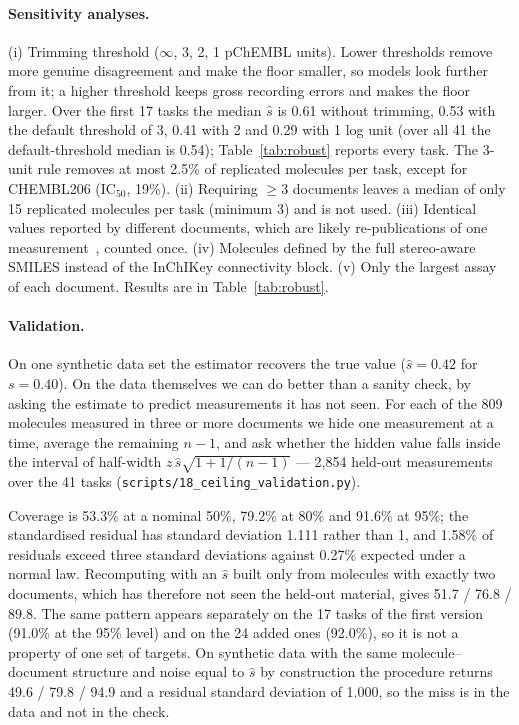 \paragraph{Sensitivity analyses.}
(i) Trimming threshold ($\infty$, 3, 2, 1 pChEMBL units). Lower thresholds remove more genuine disagreement and make the floor smaller, so models look further from it; a higher threshold keeps gross recording errors and makes the floor larger. Over the first 17 tasks the median $\hat s$ is 0.61 without trimming, 0.53 with the default threshold of 3, 0.41 with 2 and 0.29 with 1 log unit (over all 41 the default-threshold median is 0.54); Table~\ref{tab:robust} reports every task. The 3-unit rule removes at most 2.5\% of replicated molecules per task, except for CHEMBL206 ($\mathrm{IC}_{50}$, 19\%). (ii) Requiring $\ge3$ documents leaves a median of only 15 replicated molecules per task (minimum 3) and is not used. (iii) Identical values reported by different documents, which are likely re-publications of one measurement~\cite{kramer2012experimental}, counted once. (iv) Molecules defined by the full stereo-aware SMILES instead of the InChIKey connectivity block. (v) Only the largest assay of each document. Results are in Table~\ref{tab:robust}.

\paragraph{Validation.} On one synthetic data set the estimator recovers the true value ($\hat s=0.42$ for $s=0.40$). On the data themselves we can do better than a sanity check, by asking the estimate to predict measurements it has not seen. For each of the 809 molecules measured in three or more documents we hide one measurement at a time, average the remaining $n-1$, and ask whether the hidden value falls inside the interval of half-width $z\,\hat s\sqrt{1+1/(n-1)}$ --- 2{,}854 held-out measurements over the 41 tasks (\texttt{scripts/}\allowbreak\texttt{18\_ceiling\_validation.py}).

Coverage is 53.3\% at a nominal 50\%, 79.2\% at 80\% and 91.6\% at 95\%; the standardised residual has standard deviation 1.111 rather than 1, and 1.58\% of residuals exceed three standard deviations against 0.27\% expected under a normal law. Recomputing with an $\hat s$ built only from molecules with exactly two documents, which has therefore not seen the held-out material, gives 51.7 / 76.8 / 89.8. The same pattern appears separately on the 17 tasks of the first version (91.0\% at the 95\% level) and on the 24 added ones (92.0\%), so it is not a property of one set of targets. On synthetic data with the same molecule--document structure and noise equal to $\hat s$ by construction the procedure returns 49.6 / 79.8 / 94.9 and a residual standard deviation of 1.000, so the miss is in the data and not in the check.

